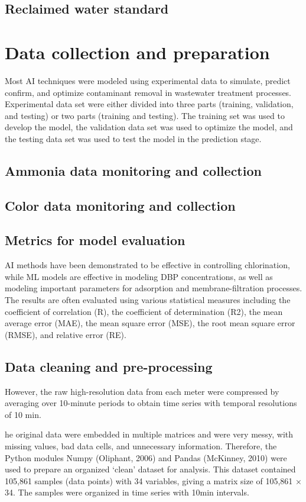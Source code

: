 \subsection{Reclaimed water standard }
\section{Data collection and preparation}
Most AI techniques were modeled using experimental data to simulate, predict confirm, and optimize contaminant removal in wastewater treatment processes. Experimental data set were either divided into three parts (training, validation, and testing) or two parts (training and testing). The training set was used to develop the model, the validation data set was used to optimize the model, and the testing data set was used to test the model in the prediction stage.
\subsection{Ammonia data monitoring and collection}

\subsection{Color data monitoring and collection}

\subsection{Metrics for model evaluation}

AI methods have been demonstrated to be effective in controlling chlorination, while ML models are effective in modeling DBP concentrations, as well as modeling important parameters for adsorption and membrane-filtration processes. The results are often evaluated using various statistical measures including the coefficient of correlation (R), the coefficient of determination (R2), the mean average error (MAE), the mean square error (MSE), the root mean square error (RMSE), and relative error (RE).
\subsection{Data cleaning and pre-processing}
However, the raw high-resolution data from each meter were compressed by averaging over 10-minute periods to obtain time series with temporal resolutions of 10 min.

he original data were embedded in multiple matrices and were very messy, with missing values, bad data cells, and unnecessary information. Therefore, the Python modules Numpy (Oliphant, 2006) and Pandas (McKinney, 2010) were used to prepare an organized ‘clean’ dataset for analysis. This dataset contained 105,861 samples (data points) with 34 variables, giving a matrix size of 105,861 × 34. The samples were organized in time series with 10min intervals.

